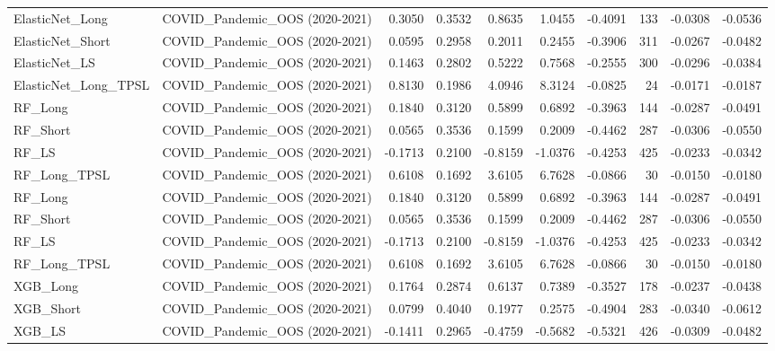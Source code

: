 \begin{tabular}{llrrrrrrrr}
\cline{1-10}
ElasticNet\_Long & COVID\_Pandemic\_OOS (2020-2021) & 0.3050 & 0.3532 & 0.8635 & 1.0455 & -0.4091 & 133 & -0.0308 & -0.0536 \\
\cline{1-10}
ElasticNet\_Short & COVID\_Pandemic\_OOS (2020-2021) & 0.0595 & 0.2958 & 0.2011 & 0.2455 & -0.3906 & 311 & -0.0267 & -0.0482 \\
\cline{1-10}
ElasticNet\_LS & COVID\_Pandemic\_OOS (2020-2021) & 0.1463 & 0.2802 & 0.5222 & 0.7568 & -0.2555 & 300 & -0.0296 & -0.0384 \\
\cline{1-10}
ElasticNet\_Long\_TPSL & COVID\_Pandemic\_OOS (2020-2021) & 0.8130 & 0.1986 & 4.0946 & 8.3124 & -0.0825 & 24 & -0.0171 & -0.0187 \\
\cline{1-10}
RF\_Long & COVID\_Pandemic\_OOS (2020-2021) & 0.1840 & 0.3120 & 0.5899 & 0.6892 & -0.3963 & 144 & -0.0287 & -0.0491 \\
\cline{1-10}
RF\_Short & COVID\_Pandemic\_OOS (2020-2021) & 0.0565 & 0.3536 & 0.1599 & 0.2009 & -0.4462 & 287 & -0.0306 & -0.0550 \\
\cline{1-10}
RF\_LS & COVID\_Pandemic\_OOS (2020-2021) & -0.1713 & 0.2100 & -0.8159 & -1.0376 & -0.4253 & 425 & -0.0233 & -0.0342 \\
\cline{1-10}
RF\_Long\_TPSL & COVID\_Pandemic\_OOS (2020-2021) & 0.6108 & 0.1692 & 3.6105 & 6.7628 & -0.0866 & 30 & -0.0150 & -0.0180 \\
\cline{1-10}
RF\_Long & COVID\_Pandemic\_OOS (2020-2021) & 0.1840 & 0.3120 & 0.5899 & 0.6892 & -0.3963 & 144 & -0.0287 & -0.0491 \\
\cline{1-10}
RF\_Short & COVID\_Pandemic\_OOS (2020-2021) & 0.0565 & 0.3536 & 0.1599 & 0.2009 & -0.4462 & 287 & -0.0306 & -0.0550 \\
\cline{1-10}
RF\_LS & COVID\_Pandemic\_OOS (2020-2021) & -0.1713 & 0.2100 & -0.8159 & -1.0376 & -0.4253 & 425 & -0.0233 & -0.0342 \\
\cline{1-10}
RF\_Long\_TPSL & COVID\_Pandemic\_OOS (2020-2021) & 0.6108 & 0.1692 & 3.6105 & 6.7628 & -0.0866 & 30 & -0.0150 & -0.0180 \\
\cline{1-10}
XGB\_Long & COVID\_Pandemic\_OOS (2020-2021) & 0.1764 & 0.2874 & 0.6137 & 0.7389 & -0.3527 & 178 & -0.0237 & -0.0438 \\
\cline{1-10}
XGB\_Short & COVID\_Pandemic\_OOS (2020-2021) & 0.0799 & 0.4040 & 0.1977 & 0.2575 & -0.4904 & 283 & -0.0340 & -0.0612 \\
\cline{1-10}
XGB\_LS & COVID\_Pandemic\_OOS (2020-2021) & -0.1411 & 0.2965 & -0.4759 & -0.5682 & -0.5321 & 426 & -0.0309 & -0.0482 \\

\end{tabular}
